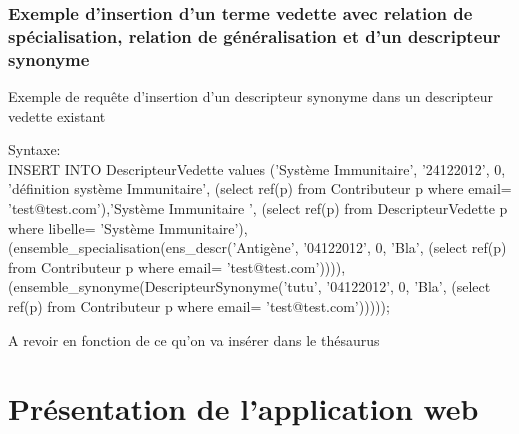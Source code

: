 \subsubsection{Exemple d'insertion d'un terme vedette avec relation de spécialisation, relation de généralisation et d'un descripteur synonyme  }

\begin{algorithm}[H]
\caption{\label{Requete\_DescSynonyme} Exemple de requête d'insertion d'un descripteur synonyme dans un descripteur vedette existant}
Syntaxe:\\
INSERT INTO DescripteurVedette values ('Système Immunitaire', '24122012', 0, 'définition système Immunitaire', (select ref(p) from Contributeur p  where email= 'test@test.com'),'Système Immunitaire ', (select ref(p) from DescripteurVedette p  where libelle= 'Système Immunitaire'), (ensemble\_specialisation(ens\_descr('Antigène', '04122012', 0, 'Bla', (select ref(p) from Contributeur p  where email= 'test@test.com')))), (ensemble\_synonyme(DescripteurSynonyme('tutu', '04122012', 0, 'Bla', (select ref(p) from Contributeur p  where email= 'test@test.com')))));

\end{algorithm}
A revoir en fonction de ce qu'on va insérer dans le thésaurus\\

\section{Présentation de l'application web}


